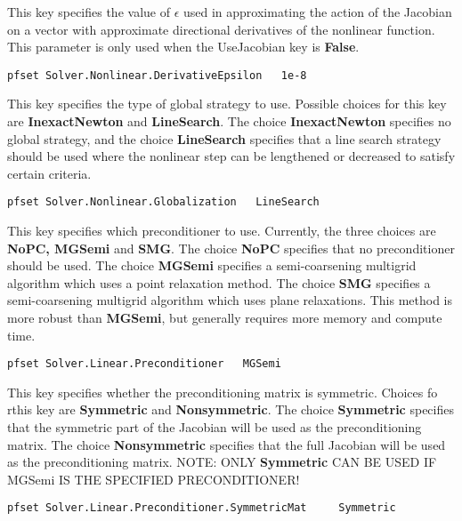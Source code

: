 {This key specifies the value of $\epsilon$ used in approximating the action of
the Jacobian on a vector with approximate directional derivatives of the
nonlinear function.  This parameter is only used when the UseJacobian key is
{\bf False}.
}
\begin{display}\begin{verbatim}
pfset Solver.Nonlinear.DerivativeEpsilon   1e-8
\end{verbatim}\end{display}

{This key specifies the type of global strategy to use.  Possible choices for
this key are {\bf InexactNewton} and {\bf LineSearch}.  The choice {\bf
InexactNewton} specifies no global strategy, and the choice {\bf LineSearch}
specifies that a line search strategy should be used where the nonlinear step
can be lengthened or decreased to satisfy certain criteria.
}
\begin{display}\begin{verbatim}
pfset Solver.Nonlinear.Globalization   LineSearch
\end{verbatim}\end{display}

{This key specifies which preconditioner to use.  Currently, the three choices
are {\bf NoPC, MGSemi} and {\bf SMG}.  The choice {\bf NoPC} specifies that no
preconditioner should be used.  The choice {\bf MGSemi} specifies 
a semi-coarsening multigrid algorithm which uses a point relaxation method. 
The choice {\bf SMG} specifies a semi-coarsening multigrid algorithm which uses
plane relaxations.  This method is more robust than {\bf MGSemi}, but generally
requires more memory and compute time.
}
\begin{display}\begin{verbatim}
pfset Solver.Linear.Preconditioner   MGSemi
\end{verbatim}\end{display}


{This key specifies whether the preconditioning matrix is symmetric.
Choices fo rthis key are {\bf Symmetric} and {\bf Nonsymmetric}.
The choice {\bf Symmetric} specifies that the symmetric part of the Jacobian
will be used as the preconditioning matrix.  The choice {\bf Nonsymmetric}
specifies that the full Jacobian will be used as the preconditioning matrix.
NOTE: ONLY {\bf Symmetric} CAN BE USED IF MGSemi IS THE SPECIFIED
PRECONDITIONER! 
}
\begin{display}\begin{verbatim}
pfset Solver.Linear.Preconditioner.SymmetricMat     Symmetric
\end{verbatim}\end{display}

